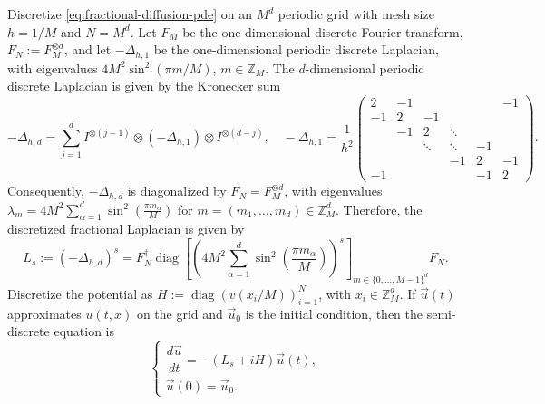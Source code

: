 \documentclass[10pt,reqno]{article}
\numberwithin{equation}{section}
\theoremstyle{plain}
\theoremstyle{definition}
\begin{document}
Discretize \cref{eq:fractional-diffusion-pde} on an \(M^d\) periodic grid with mesh size \(h=1/M\) and \(N=M^d\). Let \(F_M\) be the one-dimensional discrete Fourier transform, \(F_N:=F_M^{\otimes d}\), and let \(-\Delta_{h,1}\) be the one-dimensional periodic discrete Laplacian, with eigenvalues \(4M^2\sin^2(\pi m/M)\), \(m\in\mathbb Z_M\). The \(d\)-dimensional periodic discrete Laplacian is given by the Kronecker sum
\begin{equation}\label{eq:periodic-laplacian-kronecker-sum}
-\Delta_{h,d} = \sum_{j=1}^d I^{\otimes(j-1)} \otimes (-\Delta_{h,1}) \otimes I^{\otimes(d-j)}, \quad -\Delta_{h,1} = \frac{1}{h^2} \begin{pmatrix} 2 & -1 &        &        &        & -1\\ -1 & 2 & -1     &        &        &   \\ & -1 & 2     & \ddots &        &   \\ &    & \ddots& \ddots & -1     &   \\ &    &       & -1     & 2      & -1\\ -1 &    &       &        & -1     & 2 \end{pmatrix}.
\end{equation}
Consequently, \(-\Delta_{h,d}\) is diagonalized by \(F_N=F_M^{\otimes d}\), with eigenvalues $\lambda_m = 4M^2 \sum_{\alpha=1}^d \sin^2\left(\frac{\pi m_\alpha}{M}\right)$ for \(m=(m_1,\dots,m_d)\in \mathbb Z_M^d\). Therefore, the discretized fractional Laplacian is given by
\begin{equation}\label{eq:discrete-fractional-laplacian}
L_s := (-\Delta_{h,d})^s = F_N^\dagger \operatorname{diag}\left[ \left( 4M^2 \sum_{\alpha=1}^d \sin^2\left(\frac{\pi m_\alpha}{M}\right) \right)^s \right]_{m\in\{0,\dots,M-1\}^d} F_N .
\end{equation}
Discretize the potential as \(H:=\operatorname{diag}(v(x_i/M))_{i=1}^N\), with \(x_i\in\mathbb Z_M^d\). If \(\vec u(t)\) approximates \(u(t,x)\) on the grid and \(\vec u_0\) is the initial condition, then the semi-discrete equation is
\begin{equation}\label{eq:fractional-diffusion-discrete}
\begin{cases} \dfrac{d\vec{u}}{dt} = -(L_s+iH)\vec{u}(t), \\ \vec{u}(0)=\vec{u}_0 . \end{cases}
\end{equation}
\end{document}
